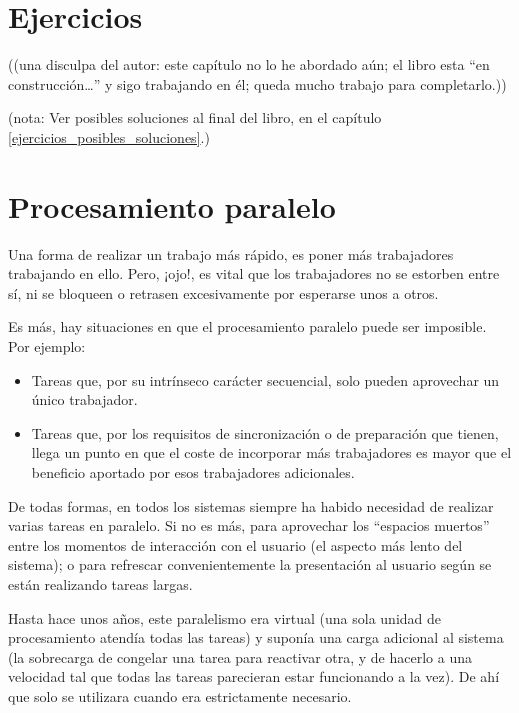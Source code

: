 \documentclass[spanish,12pt,a4paper,final,oneside]{book}
\begin{document}
\chapter{Ejercicios}\label{ejercicios_comunicaciones}

\begin{footnotesize}((una disculpa del autor: este capítulo no lo he abordado aún; el libro esta ``en construcción\ldots'' y sigo trabajando en él; queda mucho trabajo para completarlo.))\end{footnotesize}


(nota: Ver posibles soluciones al final del libro, en el capítulo \ref{ejercicios_posibles_soluciones}.)\\

\chapter{Procesamiento paralelo}
Una forma de realizar un trabajo más rápido, es poner más trabajadores trabajando en ello. Pero, ¡ojo!, es vital que los trabajadores no se estorben entre sí, ni se bloqueen o retrasen excesivamente por esperarse unos a otros.

Es más, hay situaciones en que el procesamiento paralelo puede ser imposible. Por ejemplo:
\begin{itemize}
\item Tareas que, por su intrínseco carácter secuencial, solo pueden aprovechar un único trabajador. 
\item Tareas que, por los requisitos de sincronización o de preparación que tienen, llega un punto en que el coste de incorporar más trabajadores es mayor que el beneficio aportado por esos trabajadores adicionales.
\end{itemize}

De todas formas, en todos los sistemas siempre ha habido necesidad de realizar varias tareas en paralelo. Si no es más, para aprovechar los ``espacios muertos'' entre los momentos de interacción con el usuario (el aspecto más lento del sistema); o para refrescar convenientemente la presentación al usuario según se están realizando tareas largas.

Hasta hace unos años, este paralelismo era virtual (una sola unidad de procesamiento atendía todas las tareas) y suponía una carga adicional al sistema (la sobrecarga de congelar una tarea para reactivar otra, y de hacerlo a una velocidad tal que todas las tareas parecieran estar funcionando a la vez). De ahí que solo se utilizara cuando era estrictamente necesario.
\end{document}

